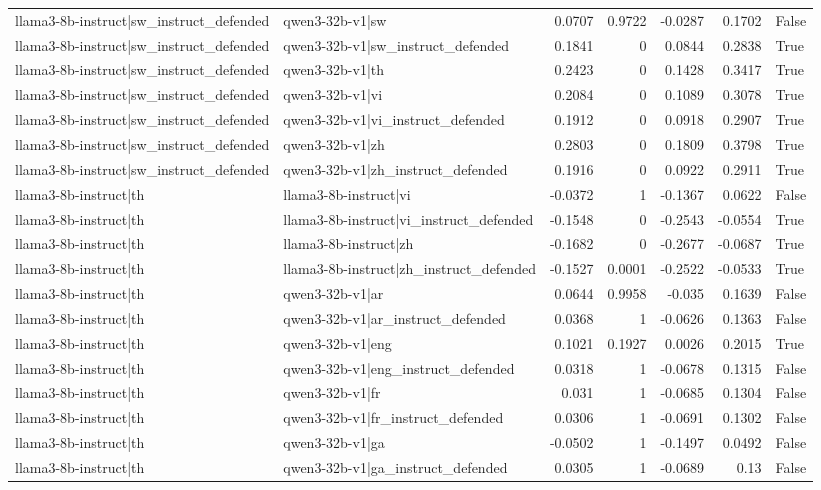 \begin{table}
\begin{tabular}{l l r r r r l}
llama3-8b-instruct|sw_instruct_defended & qwen3-32b-v1|sw & 0.0707 & 0.9722 & -0.0287 & 0.1702 & False \\
llama3-8b-instruct|sw_instruct_defended & qwen3-32b-v1|sw_instruct_defended & 0.1841 & 0 & 0.0844 & 0.2838 & True \\
llama3-8b-instruct|sw_instruct_defended & qwen3-32b-v1|th & 0.2423 & 0 & 0.1428 & 0.3417 & True \\
llama3-8b-instruct|sw_instruct_defended & qwen3-32b-v1|vi & 0.2084 & 0 & 0.1089 & 0.3078 & True \\
llama3-8b-instruct|sw_instruct_defended & qwen3-32b-v1|vi_instruct_defended & 0.1912 & 0 & 0.0918 & 0.2907 & True \\
llama3-8b-instruct|sw_instruct_defended & qwen3-32b-v1|zh & 0.2803 & 0 & 0.1809 & 0.3798 & True \\
llama3-8b-instruct|sw_instruct_defended & qwen3-32b-v1|zh_instruct_defended & 0.1916 & 0 & 0.0922 & 0.2911 & True \\
llama3-8b-instruct|th & llama3-8b-instruct|vi & -0.0372 & 1 & -0.1367 & 0.0622 & False \\
llama3-8b-instruct|th & llama3-8b-instruct|vi_instruct_defended & -0.1548 & 0 & -0.2543 & -0.0554 & True \\
llama3-8b-instruct|th & llama3-8b-instruct|zh & -0.1682 & 0 & -0.2677 & -0.0687 & True \\
llama3-8b-instruct|th & llama3-8b-instruct|zh_instruct_defended & -0.1527 & 0.0001 & -0.2522 & -0.0533 & True \\
llama3-8b-instruct|th & qwen3-32b-v1|ar & 0.0644 & 0.9958 & -0.035 & 0.1639 & False \\
llama3-8b-instruct|th & qwen3-32b-v1|ar_instruct_defended & 0.0368 & 1 & -0.0626 & 0.1363 & False \\
llama3-8b-instruct|th & qwen3-32b-v1|eng & 0.1021 & 0.1927 & 0.0026 & 0.2015 & True \\
llama3-8b-instruct|th & qwen3-32b-v1|eng_instruct_defended & 0.0318 & 1 & -0.0678 & 0.1315 & False \\
llama3-8b-instruct|th & qwen3-32b-v1|fr & 0.031 & 1 & -0.0685 & 0.1304 & False \\
llama3-8b-instruct|th & qwen3-32b-v1|fr_instruct_defended & 0.0306 & 1 & -0.0691 & 0.1302 & False \\
llama3-8b-instruct|th & qwen3-32b-v1|ga & -0.0502 & 1 & -0.1497 & 0.0492 & False \\
llama3-8b-instruct|th & qwen3-32b-v1|ga_instruct_defended & 0.0305 & 1 & -0.0689 & 0.13 & False \\

\end{tabular}
\end{table}
